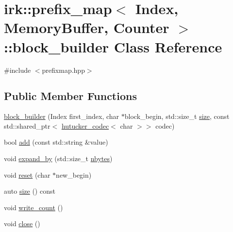 \hypertarget{classirk_1_1prefix__map_1_1block__builder}{}\section{irk\+:\+:prefix\+\_\+map$<$ Index, Memory\+Buffer, Counter $>$\+:\+:block\+\_\+builder Class Reference}
\label{classirk_1_1prefix__map_1_1block__builder}


{\ttfamily \#include $<$prefixmap.\+hpp$>$}

\subsection*{Public Member Functions}
\begin{DoxyCompactItemize}
\item 
\mbox{\hyperlink{classirk_1_1prefix__map_1_1block__builder_af6ed7104994775956eb88348b87c46d8}{block\+\_\+builder}} (Index first\+\_\+index, char $\ast$block\+\_\+begin, std\+::size\+\_\+t \mbox{\hyperlink{classirk_1_1prefix__map_1_1block__builder_ac3fb0a31f627e1f49b9eb0738742dd23}{size}}, const std\+::shared\+\_\+ptr$<$ \mbox{\hyperlink{classirk_1_1hutucker__codec}{hutucker\+\_\+codec}}$<$ char $>$$>$ codec)
\item 
bool \mbox{\hyperlink{classirk_1_1prefix__map_1_1block__builder_a7624581bf15668f0be6733f8105d4c59}{add}} (const std\+::string \&value)
\item 
void \mbox{\hyperlink{classirk_1_1prefix__map_1_1block__builder_a86b281aeb689345c5cac4b3a9266d3a6}{expand\+\_\+by}} (std\+::size\+\_\+t \mbox{\hyperlink{namespaceirk_ac58a8542fe93e44f62867d97613007ae}{nbytes}})
\item 
void \mbox{\hyperlink{classirk_1_1prefix__map_1_1block__builder_aa25610a99626d90e1b3232fc05fe58cb}{reset}} (char $\ast$new\+\_\+begin)
\item 
auto \mbox{\hyperlink{classirk_1_1prefix__map_1_1block__builder_ac3fb0a31f627e1f49b9eb0738742dd23}{size}} () const
\item 
void \mbox{\hyperlink{classirk_1_1prefix__map_1_1block__builder_acd19257e8bac2d4af07431383c1c2c16}{write\+\_\+count}} ()
\item 
void \mbox{\hyperlink{classirk_1_1prefix__map_1_1block__builder_ac2b76fd0236effde8936f1d710b29aed}{close}} ()
\end{DoxyCompactItemize}


